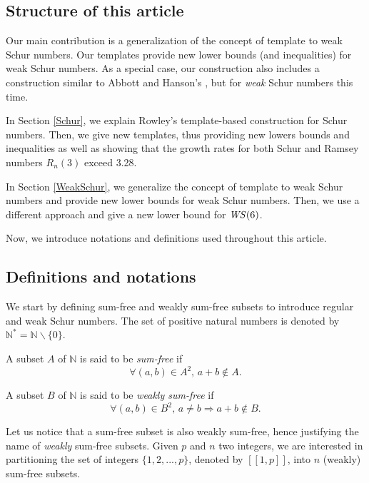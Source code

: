 \subsection{Structure of this article}

Our main contribution is a generalization of the concept of template to weak Schur numbers. Our templates 
provide new lower bounds (and inequalities) for weak Schur numbers. As a special case, our construction also includes  
a construction similar to Abbott and Hanson's \cite{AbbottHanson}, but for \textit{weak} Schur numbers this time.

\par
In Section \ref{Schur}, we explain Rowley's template-based construction for 
Schur numbers. Then, we give new templates, thus providing new lowers bounds and inequalities as well as 
showing that the growth rates for both Schur and Ramsey numbers \(R_n(3)\) exceed 3.28. 

\par
In Section \ref{WeakSchur}, we generalize the concept of template to weak Schur numbers 
and provide new lower bounds for weak Schur numbers. Then, we use a different approach and give a new 
lower bound for \(\mathit{WS}(6)\).

\par
Now, we introduce notations and definitions used throughout this article.

\subsection{Definitions and notations}

We start by defining sum-free and weakly sum-free subsets to introduce regular and weak Schur numbers. 
The set of positive natural numbers is denoted by \(\mathbb{N}^* =\mathbb{N} \backslash \{0\}\).

\begin{definition}
A subset \(A\) of \(\mathbb{N}\) is said to be \textit{sum-free} if
\[ \forall (a,b) \in A^2 \text{, } a+b \notin A.\]
\end{definition}

\begin{definition}
A subset \(B\) of \(\mathbb{N}\) is said to be \textit{weakly sum-free} if
\[ \forall (a,b) \in B^2 \text{, } a \neq b \Longrightarrow a+b \notin B.\]
\end{definition}

Let us notice that a sum-free subset is also weakly sum-free, hence justifying the name of \textit{weakly} sum-free
subsets. Given \(p\) and \(n\) two integers, we are interested in partitioning the set of integers \(\{1, 2, ..., p\}\), 
denoted by \([\![1,p]\!]\), into \(n\) (weakly) sum-free subsets.

